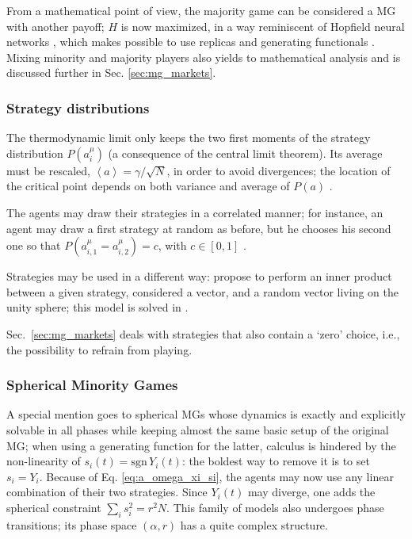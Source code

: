 \documentclass[aps,twocolumn,nofootinbib,sortedaddress,reprint]{revtex4-1}
\begin{document}
From a mathematical point of view, the majority game can be considered
a MG with another payoff; $H$ is now maximized, in a way reminiscent
of Hopfield neural networks \cite{hopfield1982neural}, which makes
possible to use replicas \cite{kozlowski2003majGame} and generating
functionals \cite{papadopoulos2009theory}. Mixing minority and
majority players also yields to mathematical analysis
\cite{deMGM03,papadopoulos2009theory} and is discussed further in
Sec. \ref{sec:mg_markets}.


\subsubsection{Strategy distributions}

The thermodynamic limit only keeps the two first moments of the
strategy distribution $P(a_{i}^{\mu})$ (a consequence of the central
limit theorem). Its average must be rescaled, $\left\langle
a\right\rangle =\gamma/\sqrt{N}$, in order to avoid divergences; the
location of the critical point depends on both variance and average of
$P(a)$ \cite{CCMZ00,CMO03}.

The agents may draw their strategies in a correlated manner; for
instance, an agent may draw a first strategy at random as before, but
he chooses his second one so that $P(a_{i,1}^\mu=a_{i,2}^\mu)=c$, with
$c\in[0,1]$ \cite{MMM,garrahan2001correlated,galla2005strategy}.

Strategies may be used in a different way: \textcite{Oxf1} propose to
perform an inner product between a given strategy, considered a
vector, and a random vector living on the unity sphere; this model is
solved in \textcite{coolen2008inner}.

Sec.~\ref{sec:mg_markets} deals with strategies that also contain a
`zero' choice, i.e., the possibility to refrain from playing.

\subsubsection{Spherical Minority Games}

A special mention goes to spherical MGs \cite{galla2003dynamics} whose
dynamics is exactly and explicitly solvable in all phases while
keeping almost the same basic setup of the original MG; when using a generating function for the latter,
calculus is hindered by the non-linearity of
$s_i(t)=\textrm{sgn}\,Y_i(t)$: the boldest way to remove it is to set
$s_i=Y_i$. Because of Eq. \eqref{eq:a_omega_xi_si}, the agents may now
use any linear combination of their two strategies. Since $Y_i(t)$ may diverge, one adds the
spherical constraint $\sum_is_i^2=r^ 2N$.  This family of models also
undergoes phase transitions; its phase space $(\alpha,r)$ has a quite
complex structure.
\end{document}
